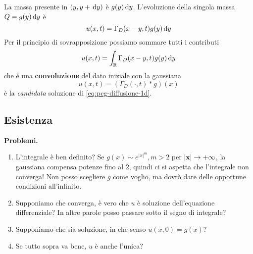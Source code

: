 La massa presente in $(y,y+\,\mathrm d y)$ è $g(y) \,\mathrm d y$. L'evoluzione della singola massa $Q=g(y) \,\mathrm d y$ è
\begin{equation*}
    u(x,t) =\Gamma _{D}(x-y,t) g(y) \,\mathrm d y
\end{equation*}
Per il principio di sovrapposizione possiamo sommare tutti i contributi
\begin{equation*}
    u(x,t) =\int _{\mathbb{R}} \Gamma _{D}(x-y,t) g(y) \,\mathrm d y
\end{equation*}
che è una \textbf{convoluzione} del dato iniziale con la gaussiana
\begin{equation*}
    u(x,t) =(\Gamma _{D}(\cdotp,t) *g)(x)
\end{equation*}
è la \textit{candidata} soluzione di \eqref{eq:pcg-diffusione-1d}.
\subsection{Esistenza}

\textbf{Problemi.}
\begin{enumerate}
    \item L'integrale è ben definito? Se $g(x) \sim e^{|x|^m},m >2$ per $|\mathbf{x}| \rightarrow +\infty $, la gaussiana compensa potenze fino al $2$, quindi ci si aspetta che l'integrale non converga! Non posso scegliere $g$ come voglio, ma dovrò dare delle opportune condizioni all'infinito.
    \item Supponiamo che converga, è vero che $u$ è soluzione dell'equazione differenziale? In altre parole posso passare sotto il segno di integrale?
    \item Supponiamo che sia soluzione, in che senso $u(x,0) =g(x)$?
    \item Se tutto sopra va bene, $u$ è anche l'unica?
\end{enumerate}

